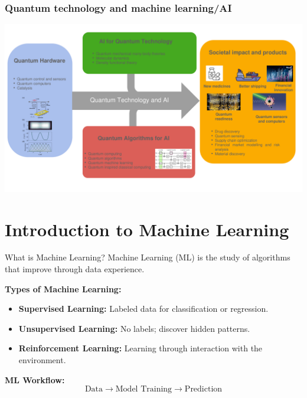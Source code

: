 \documentclass{beamer}
\begin{document}
\begin{frame}
\frametitle{Quantum technology and machine learning/AI}


\centerline{\includegraphics[width=1.05\linewidth]{figures/figureintro.pdf}}

\end{frame}



\section{Introduction to Machine Learning}
\begin{frame}{What is Machine Learning?}
Machine Learning (ML) is the study of algorithms that improve through data experience.

\textbf{Types of Machine Learning:}
\begin{itemize}
    \item \textbf{Supervised Learning:} Labeled data for classification or regression.
    \item \textbf{Unsupervised Learning:} No labels; discover hidden patterns.
    \item \textbf{Reinforcement Learning:} Learning through interaction with the environment.
\end{itemize}


\textbf{ML Workflow:}
\[
\text{Data} \rightarrow \text{Model Training} \rightarrow \text{Prediction}
\]
\end{frame}



\end{document}
